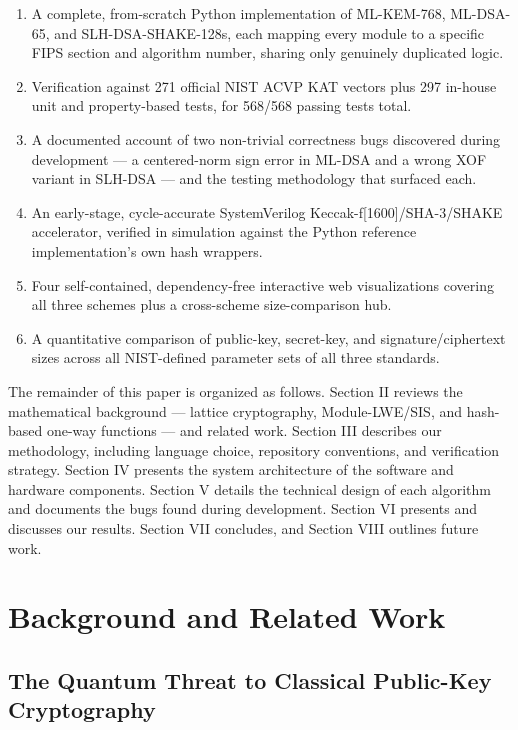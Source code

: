 \documentclass[10pt,conference]{IEEEtran}
\begin{document}
\begin{enumerate}
\item A complete, from-scratch Python implementation of ML-KEM-768,
  ML-DSA-65, and SLH-DSA-SHAKE-128s, each mapping every module to a
  specific FIPS section and algorithm number, sharing only genuinely
  duplicated logic.
\item Verification against 271 official NIST ACVP KAT vectors plus 297
  in-house unit and property-based tests, for 568/568 passing tests
  total.
\item A documented account of two non-trivial correctness bugs
  discovered during development --- a centered-norm sign error in ML-DSA
  and a wrong XOF variant in SLH-DSA --- and the testing methodology that
  surfaced each.
\item An early-stage, cycle-accurate SystemVerilog Keccak-f[1600]/SHA-3/SHAKE
  accelerator, verified in simulation against the Python reference
  implementation's own hash wrappers.
\item Four self-contained, dependency-free interactive web visualizations
  covering all three schemes plus a cross-scheme size-comparison hub.
\item A quantitative comparison of public-key, secret-key, and
  signature/ciphertext sizes across all NIST-defined parameter sets of
  all three standards.
\end{enumerate}

The remainder of this paper is organized as follows. Section II reviews
the mathematical background --- lattice cryptography, Module-LWE/SIS, and
hash-based one-way functions --- and related work. Section III describes
our methodology, including language choice, repository conventions, and
verification strategy. Section IV presents the system architecture of
the software and hardware components. Section V details the technical
design of each algorithm and documents the bugs found during
development. Section VI presents and discusses our results. Section VII
concludes, and Section VIII outlines future work.

\section{Background and Related Work}

\subsection{The Quantum Threat to Classical Public-Key Cryptography}
\end{document}
